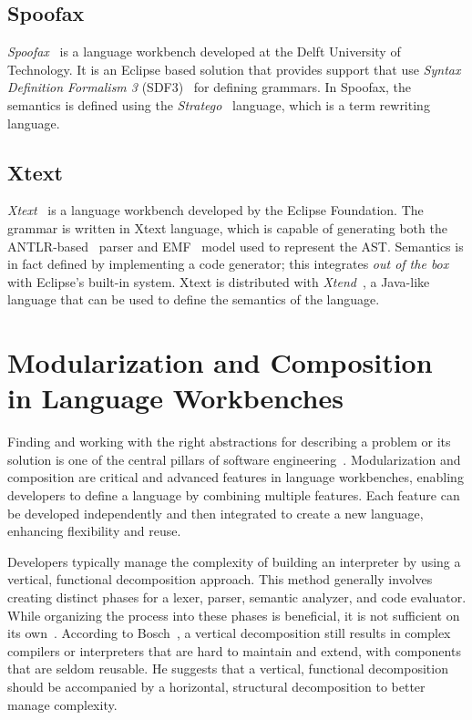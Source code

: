 \subsection{Spoofax}\label{subsec:related-work:spoofax}


\textit{Spoofax}~\cite{Visser10} is a language workbench developed at the Delft University of Technology. It is an Eclipse based solution that provides support that use \textit{Syntax Definition Formalism 3} (SDF3)~\cite{Heering89c} for defining grammars.
In Spoofax, the semantics is defined using the \textit{Stratego}~\cite{Visser01} language, which is a term rewriting language.

\subsection{Xtext}\label{subsec:related-work:xtext}

\textit{Xtext}~\cite{Bettini13b} is a language workbench developed by the Eclipse Foundation. The grammar is written in Xtext language, which is capable of generating both the ANTLR-based~\cite{Parr95} parser and EMF~\cite{Steinberg08} model used to represent the AST.  Semantics is in fact defined by implementing a code generator; this integrates \textit{out of the box} with Eclipse's built-in system. Xtext is distributed with \textit{Xtend}~\cite{Bettini13b}, a Java-like language that can be used to define the semantics of the language.

\section{Modularization and Composition in Language Workbenches}\label{sec:related-work:modularization}


Finding and working with the right abstractions for describing a problem or its solution is one of the central pillars of software engineering~\cite{Voelter12}. Modularization and composition are critical and advanced features in language workbenches, enabling developers to define a language by combining multiple features. Each feature can be developed independently and then integrated to create a new language, enhancing flexibility and reuse.

Developers typically manage the complexity of building an interpreter by using a vertical, functional decomposition approach. This method generally involves creating distinct phases for a lexer, parser, semantic analyzer, and code evaluator. While organizing the process into these phases is beneficial, it is not sufficient on its own~\cite{Cazzola16e}. According to Bosch~\cite{Bosch96}, a vertical decomposition still results in complex compilers or interpreters that are hard to maintain and extend, with components that are seldom reusable. He suggests that a vertical, functional decomposition should be accompanied by a horizontal, structural decomposition to better manage complexity.

